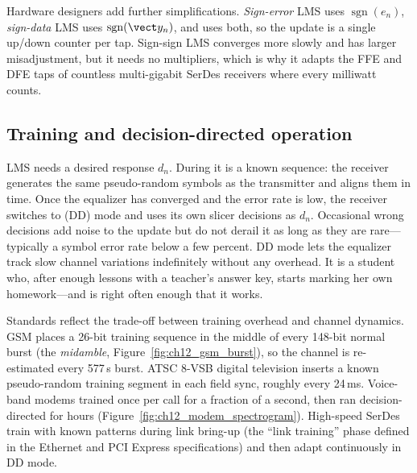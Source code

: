 Hardware designers add further simplifications. \emph{Sign-error} LMS uses $\operatorname{sgn}(e_n)$,
\emph{sign-data} LMS uses $\operatorname{sgn}(\vect y_n)$, and  uses both, so
the update is a single up/down counter per tap. Sign-sign LMS converges more slowly and has larger
misadjustment, but it needs no multipliers, which is why it adapts the FFE and DFE taps of
countless multi-gigabit SerDes receivers where every milliwatt counts.

\subsection{Training and decision-directed operation}

LMS needs a desired response $d_n$. During  it is a known sequence: the receiver
generates the same pseudo-random symbols as the transmitter and aligns them in time. Once the
equalizer has converged and the error rate is low, the receiver switches to
 (DD) mode and uses its own slicer decisions as $d_n$. Occasional wrong
decisions add noise to the update but do not derail it as long as they are rare---typically a
symbol error rate below a few percent. DD mode lets the equalizer track slow channel variations
indefinitely without any overhead. It is a student who, after enough lessons with a teacher's
answer key, starts marking her own homework---and is right often enough that it works.

Standards reflect the trade-off between training overhead and channel dynamics. GSM places a
26-bit training sequence in the middle of every 148-bit normal burst (the \emph{midamble},
Figure~\ref{fig:ch12_gsm_burst}), so the channel is re-estimated every 577\,\textmu s burst. ATSC
8-VSB digital television inserts a known pseudo-random training segment in each field sync, roughly
every 24\,ms. Voice-band modems trained once per call for a fraction of a second, then ran
decision-directed for hours (Figure~\ref{fig:ch12_modem_spectrogram}). High-speed SerDes train with
known patterns during link bring-up (the ``link training'' phase defined in the Ethernet and PCI
Express specifications) and then adapt continuously in DD mode.


